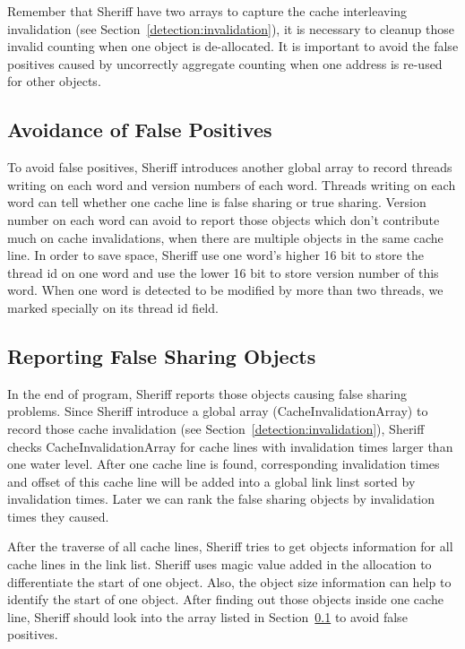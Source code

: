 Remember that Sheriff have two arrays to capture the cache interleaving invalidation
(see Section~\ref{detection:invalidation}), it is necessary to cleanup those invalid counting
when one object is de-allocated. It is important to avoid the false positives caused by uncorrectly aggregate 
counting when one address is re-used for other objects. 

\subsection{Avoidance of False Positives}
\label{detection:avoidfalsepositive}
To avoid false positives, 
Sheriff introduces another global array to record  
threads writing on each word and version numbers of each word.
Threads writing on each word can tell whether one cache line is false sharing or true sharing. 
Version number on each word can avoid to report those objects which don't contribute much on cache invalidations, 
when there are multiple objects in the same cache line.
In order to save space, Sheriff use one word's higher 16 bit to store the thread id on one word
and use the lower 16 bit to store version number of this word. 
When one word is detected to be modified by more than two threads, we marked specially
on its thread id field.

\subsection{Reporting False Sharing Objects}
In the end of program, Sheriff reports those objects causing false sharing problems. 
Since Sheriff introduce a global array (CacheInvalidationArray) to record those 
cache invalidation (see Section~\ref{detection:invalidation}), Sheriff checks 
CacheInvalidationArray for cache lines with invalidation times larger than one water level. 
After one cache line is found, corresponding invalidation times and offset of this cache line 
will be added into a global link linst sorted by invalidation times. 
Later we can rank the false sharing objects by invalidation times they caused. 

After the traverse of all cache lines, Sheriff tries to get objects information 
for all cache lines in the link list. 
Sheriff uses magic value added in the allocation to differentiate the start of one object. 
Also, the object size information can help to identify the start of one object. 
After finding out those objects inside one cache line, Sheriff should look into the 
array listed in Section~\ref{detection:avoidfalsepositive} to avoid false positives. 

